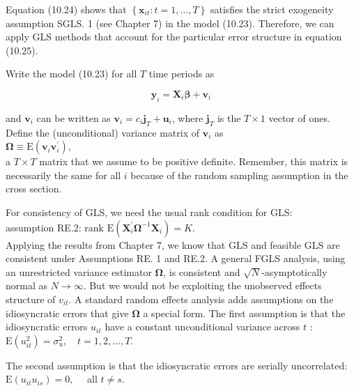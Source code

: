 \documentclass[10pt]{article}
\begin{document}
Equation (10.24) shows that $\left\{\mathbf{x}_{i t}: t=1, \ldots, T\right\}$ satisfies the strict exogeneity assumption SGLS. 1 (see Chapter 7) in the model (10.23). Therefore, we can apply GLS methods that account for the particular error structure in equation (10.25).

Write the model (10.23) for all $T$ time periods as


\begin{equation*}
\mathbf{y}_{i}=\mathbf{X}_{i} \boldsymbol{\beta}+\mathbf{v}_{i} \tag{10.26}
\end{equation*}


and $\mathbf{v}_{i}$ can be written as $\mathbf{v}_{i}=c_{i} \mathbf{j}_{T}+\mathbf{u}_{i}$, where $\mathbf{j}_{T}$ is the $T \times 1$ vector of ones. Define the (unconditional) variance matrix of $\mathbf{v}_{i}$ as\\
$\boldsymbol{\Omega} \equiv \mathrm{E}\left(\mathbf{v}_{i} \mathbf{v}_{i}^{\prime}\right)$,\\
a $T \times T$ matrix that we assume to be positive definite. Remember, this matrix is necessarily the same for all $i$ because of the random sampling assumption in the cross section.

For consistency of GLS, we need the usual rank condition for GLS:\\
assumption RE.2: rank $\mathrm{E}\left(\mathbf{X}_{i}^{\prime} \boldsymbol{\Omega}^{-1} \mathbf{X}_{i}\right)=K$.\\
Applying the results from Chapter 7, we know that GLS and feasible GLS are consistent under Assumptions RE. 1 and RE.2. A general FGLS analysis, using an unrestricted variance estimator $\boldsymbol{\Omega}$, is consistent and $\sqrt{N}$-asymptotically normal as $N \rightarrow \infty$. But we would not be exploiting the unobserved effects structure of $v_{i t}$. A standard random effects analysis adds assumptions on the idiosyncratic errors that give $\boldsymbol{\Omega}$ a special form. The first assumption is that the idiosyncratic errors $u_{i t}$ have a constant unconditional variance across $t$ :\\
$\mathrm{E}\left(u_{i t}^{2}\right)=\sigma_{u}^{2}, \quad t=1,2, \ldots, T$.

The second assumption is that the idiosyncratic errors are serially uncorrelated:\\
$\mathrm{E}\left(u_{i t} u_{i s}\right)=0, \quad$ all $t \neq s$.
\end{document}
